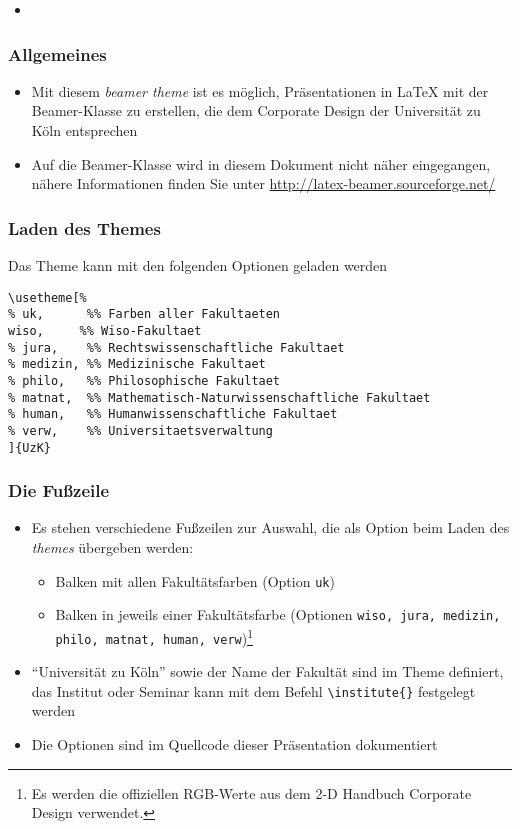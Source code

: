 \documentclass[9pt]{beamer}
\begin{document}
\begin{itemize}
\item
\end{itemize}

\begin{frame}
  \frametitle{Allgemeines}

  \begin{itemize}
  \item Mit diesem \emph{beamer theme} ist es möglich, Präsentationen in
    \LaTeX{} mit der Beamer-Klasse zu erstellen, die dem Corporate Design der
    Universität zu Köln entsprechen
  \item Auf die Beamer-Klasse wird in diesem Dokument nicht näher eingegangen,
    nähere Informationen finden Sie unter
    \url{http://latex-beamer.sourceforge.net/}
  \end{itemize}

\end{frame}

\begin{frame}[fragile]
  \frametitle{Laden des Themes}
  \begin{block}{Das Theme kann mit den folgenden Optionen geladen werden}
    \begin{small}
\begin{verbatim}
\usetheme[%
% uk,      %% Farben aller Fakultaeten
wiso,     %% Wiso-Fakultaet
% jura,    %% Rechtswissenschaftliche Fakultaet
% medizin, %% Medizinische Fakultaet
% philo,   %% Philosophische Fakultaet
% matnat,  %% Mathematisch-Naturwissenschaftliche Fakultaet
% human,   %% Humanwissenschaftliche Fakultaet
% verw,    %% Universitaetsverwaltung
]{UzK}
\end{verbatim}
    \end{small}

  \end{block}
\end{frame}

\begin{frame}
  \frametitle{Die Fußzeile}

  \begin{itemize}
  \item Es stehen verschiedene Fußzeilen zur Auswahl, die als Option
    beim Laden des \emph{themes} übergeben werden:
    \begin{itemize}
    \item Balken mit allen Fakultätsfarben (Option \texttt{uk})
    \item Balken in jeweils einer Fakultätsfarbe (Optionen \texttt{wiso, jura,
        medizin, philo, matnat, human, verw})\footnote{Es werden die offiziellen
        RGB-Werte aus dem 2-D Handbuch Corporate Design verwendet.}
    \end{itemize}
  \item "`Universität zu Köln"' sowie der Name der Fakultät sind im
    Theme definiert, das Institut oder Seminar kann mit dem Befehl
    \texttt{\textbackslash institute\{\}} festgelegt werden
  \item Die Optionen sind im Quellcode dieser Präsentation dokumentiert
  \end{itemize}

\end{frame}
\end{document}
